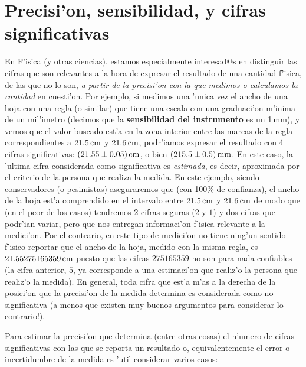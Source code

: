 \section{Precisi'on, sensibilidad, y cifras significativas}

En F'isica (y otras ciencias), estamos especialmente interesad@s en distinguir las cifras que son relevantes a la hora de expresar el resultado de una cantidad f'isica, de las que no lo son, \textit{a partir de la precisi'on con la que medimos o calculamos la cantidad} en cuesti'on. Por ejemplo, si medimos una 'unica vez el ancho de una hoja con una regla (o similar) que tiene una escala con una graduaci'on m'inima de un mil'imetro (decimos que la \textbf{sensibilidad del instrumento} es un 1\,mm), y vemos que el valor buscado est'a en la zona interior entre las marcas de la regla correspondientes a $21.5\,\rm cm$ y $21.6\,\rm cm$, podr'iamos expresar el resultado con 4 cifras significativas: $(21.55\pm 0.05)\,\rm cm$, o bien $(215.5\pm 0.5)\,\rm mm$. En este caso, la 'ultima cifra considerada como significativa es \textit{estimada}, es decir, aproximada por el criterio de la persona que realiza la medida. En este ejemplo, siendo conservadores (o pesimistas) aseguraremos que (con 100\% de confianza), el ancho de la hoja est'a comprendido en el intervalo entre $21.5\,\rm cm$ y $21.6\,\rm cm$ de modo que (en el peor de los casos) tendremos 2 cifras seguras ($2$ y $1$) y dos cifras que podr'ian variar, pero que nos entregan informaci'on f'isica relevante a la medici'on. Por el contrario, en este tipo de medici'on no tiene ning'un sentido f'isico reportar que el ancho de la hoja, medido con la misma regla, es $21.55275165359\,\rm cm$ puesto que las cifras $275165359$ no son para nada confiables (la cifra anterior, $5$, ya corresponde a una estimaci'on que realiz'o la persona que realiz'o la medida). En general, toda cifra que est'a m'as a la derecha de la posici'on que la precisi'on de la medida determina es considerada como no significativa (a menos que existen muy buenos argumentos para considerar lo contrario!).

Para estimar la precisi'on que determina (entre otras cosas) el n'umero de cifras significativas con las que se reporta un resultado o, equivalentemente el error o incertidumbre de la medida es 'util considerar varios casos:

